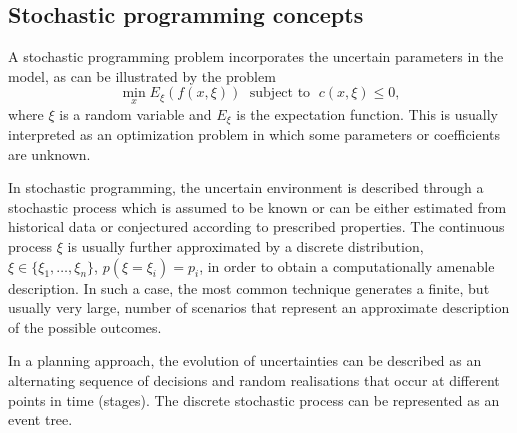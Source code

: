 \subsection{Stochastic programming concepts}


A stochastic programming problem incorporates the uncertain parameters
in the model, as can be illustrated by the problem
%
\begin{equation}
\min_x E_\xi(f(x, \xi)) \;\text{ subject to }\; c(x, \xi) \le 0,
\label{continuousSP}
\end{equation}
%
where $\xi$ is a random variable and $E_\xi$ is the expectation function.
This is usually interpreted as an optimization
problem in which some parameters or coefficients are unknown.

In stochastic programming, the uncertain environment is described 
through a stochastic process which is assumed to be known or can be
either estimated from 
historical data or conjectured according to prescribed properties. The 
continuous process $\xi$ is usually further approximated by a discrete 
distribution, $\xi \in \{\xi_1, \ldots,\xi_n\}$, $p(\xi=\xi_i) = p_i$,
in order to obtain a computationally amenable description. 
%
In such a case, the most common technique generates a 
finite, but usually very large, number of scenarios that represent an 
approximate description of the possible outcomes.


In a planning approach, the evolution of uncertainties can be 
described as an alternating sequence of decisions and random 
realisations that occur at different points in time (stages).
The discrete stochastic process can be represented as an event tree.

